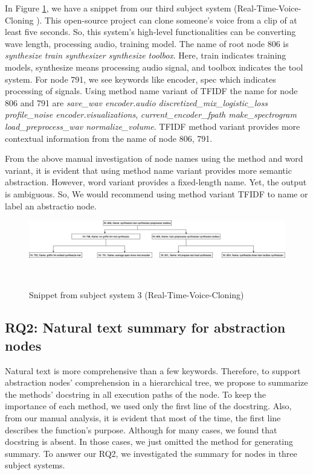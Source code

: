 In Figure \ref{fig:rq1_realTime1}, we have a snippet from our third subject system (Real-Time-Voice-Cloning \cite{realTime}). This open-source project can clone someone's voice from a clip of at least five seconds. So, this system's high-level functionalities can be converting wave length, processing audio, training model. The name of root node 806 is \textit{synthesize train synthesizer synthesize toolbox}. Here, train indicates training models, synthesize means processing audio signal, and toolbox indicates the tool system. For node 791, we see keywords like encoder, spec which indicates processing of signals. Using method name variant of TFIDF the name for node 806 and 791 are \textit{save\_wav encoder.audio discretized\_mix\_logistic\_loss profile\_noise encoder.visualizations}, \textit{current\_encoder\_fpath make\_spectrogram load\_preprocess\_wav normalize\_volume}. TFIDF method variant provides more contextual information from the name of node 806, 791. 

From the above manual investigation of node names using the method and word variant, it is evident that using method name variant provides more semantic abstraction. However, word variant provides a fixed-length  name. Yet, the output is ambiguous. So, We would recommend using method variant TFIDF to name or label an abstractio node.


\begin{figure}[tb]
  \centering
  \includegraphics[width=\columnwidth]{figures/hla2/rq1_realTime1.png}
  \caption{Snippet from subject system 3 (Real-Time-Voice-Cloning)}~\label{fig:rq1_realTime1}
\end{figure}



\subsection{ RQ2: Natural text summary for abstraction nodes}
 Natural text is more comprehensive than a few keywords. Therefore, to support abstraction nodes' comprehension in a hierarchical tree, we propose to summarize the methods' docstring in all execution paths of the node. To keep the importance of each method, we used only the first line of the docstring. Also, from our manual analysis, it is evident that most of the time, the first line describes the function's purpose. Although for many cases, we found that docstring is absent. In those cases, we just omitted the method for generating summary. To answer our RQ2, we investigated the summary for nodes in three subject systems. 
 
